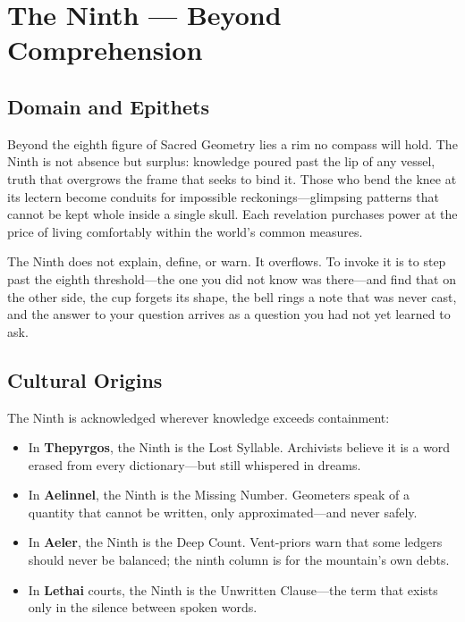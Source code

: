 \section{The Ninth — Beyond Comprehension}

\subsection{Domain and Epithets}

Beyond the eighth figure of Sacred Geometry lies a rim no compass will hold. The Ninth is not absence but surplus: knowledge poured past the lip of any vessel, truth that overgrows the frame that seeks to bind it. Those who bend the knee at its lectern become conduits for impossible reckonings—glimpsing patterns that cannot be kept whole inside a single skull. Each revelation purchases power at the price of living comfortably within the world's common measures.

The Ninth does not explain, define, or warn. It overflows. To invoke it is to step past the eighth threshold—the one you did not know was there—and find that on the other side, the cup forgets its shape, the bell rings a note that was never cast, and the answer to your question arrives as a question you had not yet learned to ask.

\subsection{Cultural Origins}

The Ninth is acknowledged wherever knowledge exceeds containment:

\begin{itemize}
\item In \textbf{Thepyrgos}, the Ninth is the Lost Syllable. Archivists believe it is a word erased from every dictionary—but still whispered in dreams.
\item In \textbf{Aelinnel}, the Ninth is the Missing Number. Geometers speak of a quantity that cannot be written, only approximated—and never safely.
\item In \textbf{Aeler}, the Ninth is the Deep Count. Vent-priors warn that some ledgers should never be balanced; the ninth column is for the mountain's own debts.
\item In \textbf{Lethai} courts, the Ninth is the Unwritten Clause—the term that exists only in the silence between spoken words.
\end{itemize}

